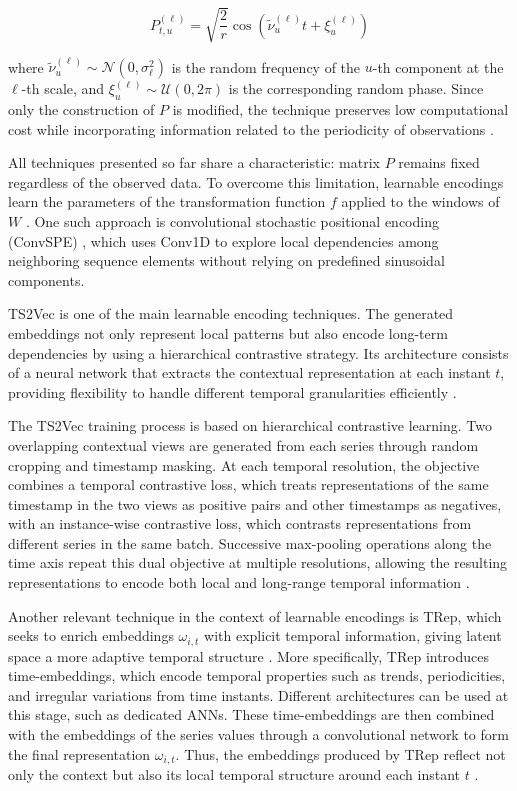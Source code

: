 \documentclass[final,3p,times,twocolumn,authoryear]{elsarticle}
\begin{document}
\begin{equation}
\label{eq_msrff}
P^{(\ell)}_{t,u} = \sqrt{\frac{2}{r}} \cos\!\left(\tilde{\nu}^{(\ell)}_u t + \xi^{(\ell)}_u\right)
\end{equation}

where $\tilde{\nu}^{(\ell)}_u\sim\mathcal{N}(0,\sigma_\ell^2)$ is the random frequency of the $u$-th component at the $\ell$-th scale, and $\xi^{(\ell)}_u\sim\mathcal{U}(0,2\pi)$ is the corresponding random phase. Since only the construction of $P$ is modified, the technique preserves low computational cost while incorporating information related to the periodicity of observations \citep{novelli_fast_2025}.

All techniques presented so far share a characteristic: matrix $P$ remains fixed regardless of the observed data. To overcome this limitation, learnable encodings learn the parameters of the transformation function $f$ applied to the windows of $W$ \citep{trirat_universal_2026}. One such approach is convolutional stochastic positional encoding (ConvSPE) \citep{liutkus_relative_2021}, which uses Conv1D to explore local dependencies among neighboring sequence elements \citep{larabenitez_temporal_2020} without relying on predefined sinusoidal components.

TS2Vec is one of the main learnable encoding techniques. The generated embeddings not only represent local patterns but also encode long-term dependencies by using a hierarchical contrastive strategy. Its architecture consists of a neural network that extracts the contextual representation at each instant $t$, providing flexibility to handle different temporal granularities efficiently \citep{yue_ts2vec_2022}.

The TS2Vec training process is based on hierarchical contrastive learning. Two overlapping contextual views are generated from each series through random cropping and timestamp masking. At each temporal resolution, the objective combines a temporal contrastive loss, which treats representations of the same timestamp in the two views as positive pairs and other timestamps as negatives, with an instance-wise contrastive loss, which contrasts representations from different series in the same batch. Successive max-pooling operations along the time axis repeat this dual objective at multiple resolutions, allowing the resulting representations to encode both local and long-range temporal information \citep{yue_ts2vec_2022}.

Another relevant technique in the context of learnable encodings is TRep, which seeks to enrich embeddings $\omega_{i,t}$ with explicit temporal information, giving latent space a more adaptive temporal structure \citep{fraikin_trep_2024}. More specifically, TRep introduces time-embeddings, which encode temporal properties such as trends, periodicities, and irregular variations from time instants. Different architectures can be used at this stage, such as dedicated ANNs. These time-embeddings are then combined with the embeddings of the series values through a convolutional network to form the final representation $\omega_{i,t}$. Thus, the embeddings produced by TRep reflect not only the context but also its local temporal structure around each instant $t$ \citep{fraikin_trep_2024}.
\end{document}
